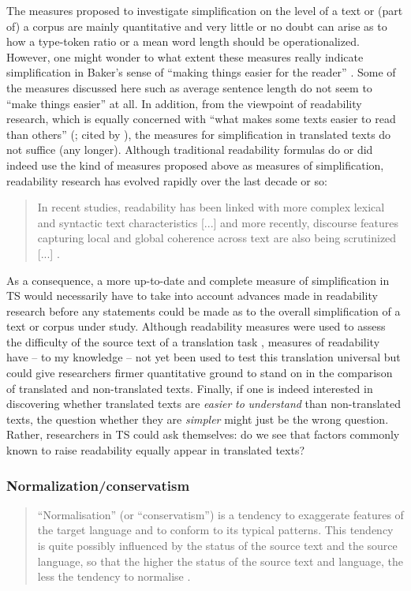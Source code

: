 The measures proposed to investigate simplification on the level of a text or (part of) a corpus are mainly quantitative and very little or no doubt can arise as to how a type-token ratio or a mean word length should be operationalized. However, one might wonder to what extent these measures really indicate simplification in Baker’s sense of “making things easier for the reader” \citep[182]{baker_corpus-based_1996}. Some of the measures discussed here such as average sentence length do not seem to “make things easier” \citep{baker_corpus-based_1996} at all. In addition, from the viewpoint of readability research, which is equally concerned with “what makes some texts easier to read than others” (\citealt{dubay_principles_2004}; cited by \citealt{clercq_using_2014}), the measures for simplification in translated texts do not suffice (any longer). Although traditional readability formulas do or did indeed use the kind of measures proposed above as measures of simplification, readability research has evolved rapidly over the last decade or so:

\begin{quote}
In recent studies, readability has been linked with more complex lexical and syntactic text characteristics [...] and more recently, discourse features capturing local and global coherence across text are also being scrutinized [...] \citep[294]{clercq_using_2014}.
\end{quote}\largerpage

As a consequence, a more up-to-date and complete measure of simplification in TS would necessarily have to take into account advances made in readability research before any statements could be made as to the overall simplification of a text or corpus under study. Although readability measures were used to assess the difficulty of the source text of a translation task \citep{gopferich_indicators_2009,sun_measuring_2014}, measures of readability have – to my knowledge – not yet been used to test this translation universal but could give researchers firmer quantitative ground to stand on in the comparison of translated and non-translated texts. Finally, if one is indeed interested in discovering whether translated texts are \textit{easier} \textit{to} \textit{understand} than non-translated texts, the question whether they are \textit{simpler} might just be the wrong question. Rather, researchers in TS could ask themselves: do we see that factors commonly known to raise readability equally appear in translated texts?

\subsubsection{Normalization/conservatism}\largerpage
\label{sec:2.2.2.3}  
\begin{quote}
“Normalisation” (or “conservatism”) is a tendency to exaggerate features of the target language and to conform to its typical patterns. This tendency is quite possibly influenced by the status of the source text and the source language, so that the higher the status of the source text and language, the less the tendency to normalise \citep[183]{baker_corpus-based_1996}.
\end{quote}

